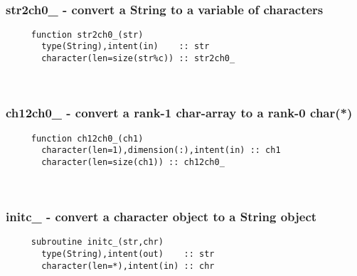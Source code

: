 
\mbox{}\hrulefill\ 
 
  \subsubsection{str2ch0\_ - convert a String to a variable of characters}

\begin{verbatim} 
     function str2ch0_(str)
       type(String),intent(in)    :: str
       character(len=size(str%c)) :: str2ch0_
 \end{verbatim}%
 
 
\mbox{}\hrulefill\ 
 
  \subsubsection{ch12ch0\_ - convert a rank-1 char-array to a rank-0 char(*)}

\begin{verbatim} 
     function ch12ch0_(ch1)
       character(len=1),dimension(:),intent(in) :: ch1
       character(len=size(ch1)) :: ch12ch0_
 \end{verbatim}%
 
 
\mbox{}\hrulefill\ 

  \subsubsection{initc\_ - convert a character object to a String object}

\begin{verbatim} 
     subroutine initc_(str,chr)
       type(String),intent(out)    :: str
       character(len=*),intent(in) :: chr
 \end{verbatim}%
 
